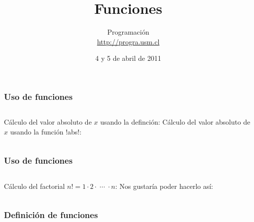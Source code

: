 \documentclass[12pt]{beamer}
\title{Funciones}
\author{
  Programación \\ \url{http://progra.usm.cl}
}
\date{4 y 5 de abril de 2011}
\begin{document}
  \begin{frame}
    \maketitle
  \end{frame}

  \begin{frame}
    \frametitle{Uso de funciones}
    \label{uso-funcion-abs}
    \begin{columns}[t]
        Cálculo del valor absoluto de \(x\)
        usando la definción:
        Cálculo del valor absoluto de \(x\)
        usando la función \li!abs!:
    \end{columns}
    \vspace{2ex}
    \begin{columns}[t]
        \footnotesize
        
        \footnotesize
        
    \end{columns}
  \end{frame}

  \begin{frame}
    \frametitle{Uso de funciones}
    \label{uso-funcion-factorial}
    \begin{columns}[t]
        Cálculo del factorial \(n! = 1\cdot 2\cdot\;\cdots\;\cdot n\):
        Nos gustaría
        poder hacerlo así:
    \end{columns}
    \vspace{2ex}
    \begin{columns}[t]
        \footnotesize
        
        \footnotesize
        
    \end{columns}
  \end{frame}

  \begin{frame}
    \frametitle{Definición de funciones}
    \label{def-fn-factorial}
    
  \end{frame}
\end{document}
